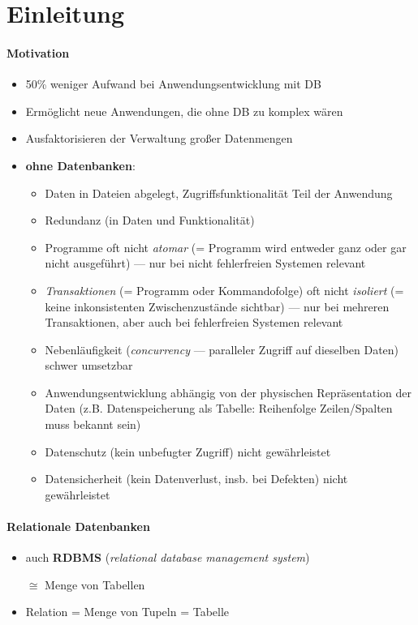 \section{Einleitung}
\label{sec:einleitung}

\paragraph{Motivation}
\begin{itemize}
  \item 50\% weniger Aufwand bei Anwendungsentwicklung mit DB
  \item Ermöglicht neue Anwendungen, die ohne DB zu komplex wären
  \item Ausfaktorisieren der Verwaltung großer Datenmengen
  \item \textbf{ohne Datenbanken}:
  \begin{itemize}
    \item Daten in Dateien abgelegt, Zugriffsfunktionalität Teil der Anwendung
    \item Redundanz (in Daten und Funktionalität)
    \item Programme oft nicht \emph{atomar} (= Programm wird entweder ganz oder gar nicht ausgeführt) --- nur bei nicht fehlerfreien Systemen relevant
    \item \emph{Transaktionen} (= Programm oder Kommandofolge) oft nicht \emph{isoliert} (= keine inkonsistenten Zwischenzustände sichtbar) --- nur bei mehreren Transaktionen, aber auch bei fehlerfreien Systemen relevant
    \item Nebenläufigkeit (\emph{concurrency} --- paralleler Zugriff auf dieselben Daten) schwer umsetzbar
    \item Anwendungsentwicklung abhängig von der physischen Repräsentation der Daten (z.B. Datenspeicherung als Tabelle: Reihenfolge Zeilen/Spalten muss bekannt sein)
    \item Datenschutz (kein unbefugter Zugriff) nicht gewährleistet
    \item Datensicherheit (kein Datenverlust, insb. bei Defekten) nicht gewährleistet
  \end{itemize}
\end{itemize}

\paragraph{Relationale Datenbanken}
\begin{itemize}
  \item auch \textbf{RDBMS} (\emph{relational database management system})
  \item[\( \cong \)] Menge von Tabellen
  \item Relation = Menge von Tupeln = Tabelle
\end{itemize}


